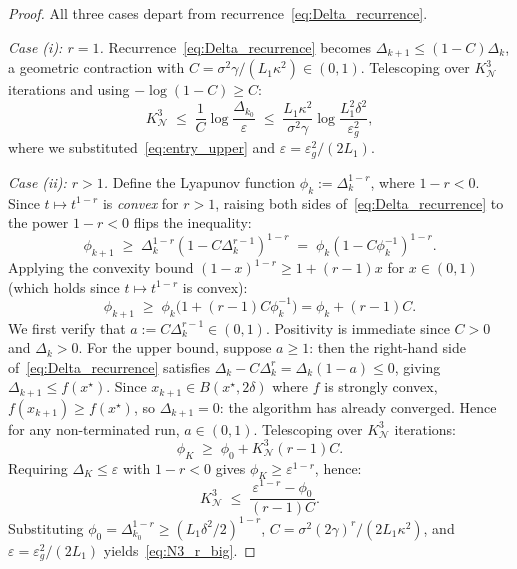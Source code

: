 \documentclass{article}
\begin{document}
\begin{proof}
All three cases depart from recurrence~\eqref{eq:Delta_recurrence}.

\medskip
\noindent\textit{Case (i): $r=1$.}
Recurrence~\eqref{eq:Delta_recurrence} becomes
$\Delta_{k+1}\leq(1-C)\Delta_k$, a geometric contraction with
$C=\sigma^2\gamma/(L_1\kappa^2)\in(0,1)$.
Telescoping over $K^3_{\mathcal{N}}$ iterations and using
$-\log(1-C)\geq C$:
\[
K^3_{\mathcal{N}} \;\leq\; \frac{1}{C}\log\frac{\Delta_{k_0}}{\varepsilon}
\;\leq\; \frac{L_1\kappa^2}{\sigma^2\gamma}\log\frac{L_1^2\delta^2}{\varepsilon_g^2},
\]
where we substituted~\eqref{eq:entry_upper} and
$\varepsilon=\varepsilon_g^2/(2L_1)$.

\medskip
\noindent\textit{Case (ii): $r>1$.}
Define the Lyapunov function $\phi_k:=\Delta_k^{1-r}$, where $1-r<0$.
Since $t\mapsto t^{1-r}$ is \emph{convex} for $r>1$, raising both
sides of~\eqref{eq:Delta_recurrence} to the power $1-r<0$ flips the
inequality:
\[
\phi_{k+1} \;\geq\; \Delta_k^{1-r}(1-C\Delta_k^{r-1})^{1-r}
\;=\; \phi_k(1-C\phi_k^{-1})^{1-r}.
\]
Applying the convexity bound $(1-x)^{1-r}\geq 1+(r-1)x$ for
$x\in(0,1)$ (which holds since $t\mapsto t^{1-r}$ is convex):
\[
\phi_{k+1} \;\geq\; \phi_k\bigl(1+(r-1)C\phi_k^{-1}\bigr)
= \phi_k + (r-1)C.
\]
We first verify that $a := C\Delta_k^{r-1} \in (0,1)$.
Positivity is immediate since $C > 0$ and $\Delta_k > 0$.
For the upper bound, suppose $a \geq 1$: then the right-hand
side of~\eqref{eq:Delta_recurrence} satisfies
$\Delta_k - C\Delta_k^r = \Delta_k(1 - a) \leq 0$,
giving $\Delta_{k+1} \leq f(x^\star)$. Since $x_{k+1}
\in B(x^\star, 2\delta)$ where $f$ is strongly convex,
$f(x_{k+1}) \geq f(x^\star)$, so $\Delta_{k+1} = 0$:
the algorithm has already converged. Hence for any
non-terminated run, $a \in (0,1)$.
Telescoping over $K^3_{\mathcal{N}}$ iterations:
\[
\phi_K \;\geq\; \phi_0 + K^3_{\mathcal{N}}(r-1)C.
\]
Requiring $\Delta_K\leq\varepsilon$ with $1-r<0$ gives
$\phi_K\geq\varepsilon^{1-r}$, hence:
\[
K^3_{\mathcal{N}} \;\leq\;
\frac{\varepsilon^{1-r}-\phi_0}{(r-1)C}.
\]
Substituting $\phi_0=\Delta_{k_0}^{1-r}\geq(L_1\delta^2/2)^{1-r}$,
$C=\sigma^2(2\gamma)^r/(2L_1\kappa^2)$, and
$\varepsilon=\varepsilon_g^2/(2L_1)$ yields~\eqref{eq:N3_r_big}.


\end{proof}
\end{document}
